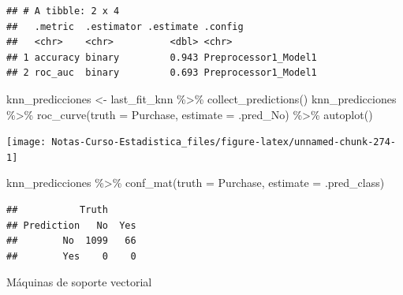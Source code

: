 \documentclass[
  12pt,
]{book}
\newenvironment{Shaded}{\begin{snugshade}}{\end{snugshade}}
\newcommand{\AttributeTok}[1]{\textcolor[rgb]{0.77,0.63,0.00}{#1}}
\newcommand{\FunctionTok}[1]{\textcolor[rgb]{0.00,0.00,0.00}{#1}}
\newcommand{\NormalTok}[1]{#1}
\newcommand{\OtherTok}[1]{\textcolor[rgb]{0.56,0.35,0.01}{#1}}
\newcommand{\SpecialCharTok}[1]{\textcolor[rgb]{0.00,0.00,0.00}{#1}}
\theoremstyle{definition}
\theoremstyle{definition}
\theoremstyle{definition}
\theoremstyle{definition}
\theoremstyle{remark}
\begin{document}
\begin{verbatim}
## # A tibble: 2 x 4
##   .metric  .estimator .estimate .config             
##   <chr>    <chr>          <dbl> <chr>               
## 1 accuracy binary         0.943 Preprocessor1_Model1
## 2 roc_auc  binary         0.693 Preprocessor1_Model1
\end{verbatim}

\begin{Shaded}
\begin{Highlighting}[]
\NormalTok{knn\_predicciones }\OtherTok{\textless{}{-}}\NormalTok{ last\_fit\_knn }\SpecialCharTok{\%\textgreater{}\%}
    \FunctionTok{collect\_predictions}\NormalTok{()}
\NormalTok{knn\_predicciones }\SpecialCharTok{\%\textgreater{}\%}
    \FunctionTok{roc\_curve}\NormalTok{(}\AttributeTok{truth =}\NormalTok{ Purchase, }\AttributeTok{estimate =}\NormalTok{ .pred\_No) }\SpecialCharTok{\%\textgreater{}\%}
    \FunctionTok{autoplot}\NormalTok{()}
\end{Highlighting}
\end{Shaded}

\begin{center}\texttt{[image: Notas-Curso-Estadistica\_files/figure-latex/unnamed-chunk-274-1]} \end{center}

\begin{Shaded}
\begin{Highlighting}[]
\NormalTok{knn\_predicciones }\SpecialCharTok{\%\textgreater{}\%}
    \FunctionTok{conf\_mat}\NormalTok{(}\AttributeTok{truth =}\NormalTok{ Purchase, }\AttributeTok{estimate =}\NormalTok{ .pred\_class)}
\end{Highlighting}
\end{Shaded}

\begin{verbatim}
##           Truth
## Prediction   No  Yes
##        No  1099   66
##        Yes    0    0
\end{verbatim}

Máquinas de soporte vectorial
\end{document}
